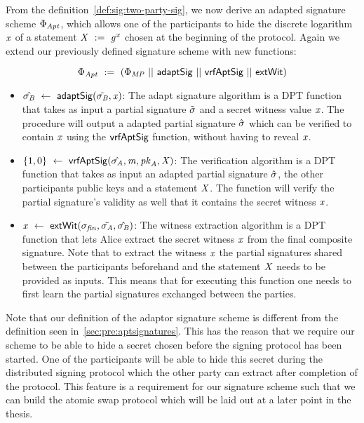 \begin{definition}
    \label{def:sig:two-party-fixed-wit-apt-sig}
    From the definition~\ref{def:sig:two-party-sig}, we now derive an adapted signature scheme $\Phi_{\mathit{Apt}}$, which allows one of the participants to hide the discrete logarithm $\mathit{x}$ of a statement $\mathit{X} ~:=~ \mathit{g}^{\mathit{x}}$ chosen
    at the beginning of the protocol.
    Again we extend our previously defined signature scheme with new functions:

    \[ \Phi_{\mathit{Apt}} ~:=~ (\Phi_{\mathit{MP}} ~||~ \mathsf{adaptSig} ~||~ \mathsf{vrfAptSig} ~||~ \mathsf{extWit}) \]

    \begin{itemize}
        \item $\hat{\sigma_{\mathit{B}}} ~\leftarrow~ \mathsf{adaptSig}(\tilde{\sigma_{\mathit{B}}}, \mathit{x})$: The adapt signature algorithm is a DPT function that takes as input a partial signature $\tilde{\sigma}$ and a secret witness value $\mathit{x}$.
        The procedure will output a adapted partial signature $\hat{\sigma}$ which can be verified to contain $\mathit{x}$ using the $\mathsf{vrfAptSig}$ function, without having to reveal $\mathit{x}$.
        \item $\{1,0\} ~\leftarrow~ \mathsf{vrfAptSig}(\hat{\sigma_{\mathit{A}}},\mathit{m},\mathit{pk}_{\mathit{A}},\mathit{X})$: The verification algorithm is a DPT function that takes as input an adapted partial signature $\hat{\sigma}$,
        the other participants public keys and a statement $\mathit{X}$. The function will verify the partial signature's validity as well that it contains the secret witness $\mathit{x}$.
        \item $\mathit{x} ~\leftarrow~ \mathsf{extWit}(\sigma_{\mathit{fin}}, \tilde{\sigma_{\mathit{A}}}, \hat{\sigma_{\mathit{B}}})$: The witness extraction algorithm is a DPT function that lets Alice extract the secret witness $\mathit{x}$ from the final composite
        signature. Note that to extract the witness $\mathit{x}$ the partial signatures shared between the participants beforehand and the statement $\mathit{X}$ needs to be provided as inputs. This means that for
        executing this function one needs to first learn the partial signatures exchanged between the parties.
    \end{itemize}
\end{definition}

Note that our definition of the adaptor signature scheme is different from the definition seen in~\ref{sec:pre:aptsignatures}.
This has the reason that we require our scheme to be able to hide a secret chosen before the signing protocol has been started.
One of the participants will be able to hide this secret during the distributed signing protocol which the other party can extract after completion of the protocol.
This feature is a requirement for our signature scheme such that we can build the atomic swap protocol which will be laid out at a later point in the thesis.


